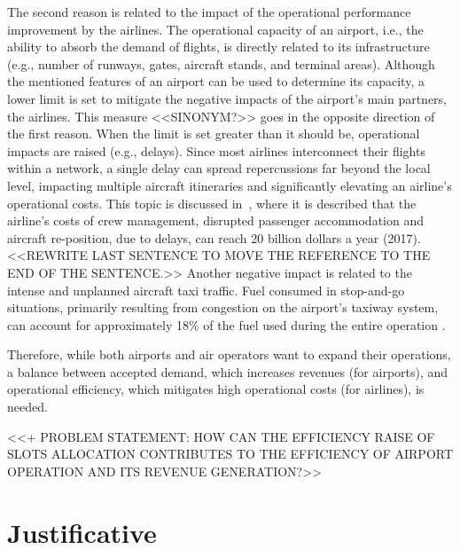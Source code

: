 The second reason is related to the impact of the operational performance
improvement by the airlines.
%
The operational capacity of an airport, i.e., the ability to absorb the demand
of flights, is directly related to its infrastructure (e.g., number of runways,
gates, aircraft stands, and terminal areas).
%
Although the mentioned features of an airport can be used to determine its
capacity, a lower limit is set to mitigate the negative impacts of the airport’s
main partners, the airlines.
%
This measure <<SINONYM?>> goes in the opposite direction of the first reason.
%
When the limit is set greater than it should be, operational impacts are raised
(e.g., delays).
%
Since most airlines interconnect their flights within a network, a single delay
can spread repercussions far beyond the local level, impacting multiple aircraft
itineraries and significantly elevating an airline’s operational costs.
%
This topic is discussed in~\cite{ball2010total}, where it is described that the
airline's costs of crew management, disrupted passenger accommodation and
aircraft re-position, due to delays, can reach 20 billion dollars a year (2017).
<<REWRITE LAST SENTENCE TO MOVE THE REFERENCE TO THE END OF THE SENTENCE.>>
%
Another negative impact is related to the intense and unplanned aircraft taxi
traffic.
%
Fuel consumed in stop-and-go situations, primarily resulting from congestion on
the airport’s taxiway system, can account for approximately 18\% of the fuel
used during the entire operation \cite{nikoleris2011detailed}.




Therefore, while both airports and air operators want to expand their
operations, a balance between accepted demand, which increases revenues (for
airports), and operational efficiency, which mitigates high operational costs
(for airlines), is needed.


<<+ PROBLEM STATEMENT: HOW CAN THE EFFICIENCY RAISE OF SLOTS ALLOCATION
CONTRIBUTES TO THE EFFICIENCY OF AIRPORT OPERATION AND ITS REVENUE GENERATION?>>














\section{Justificative}
\label{sec:Justificative}





